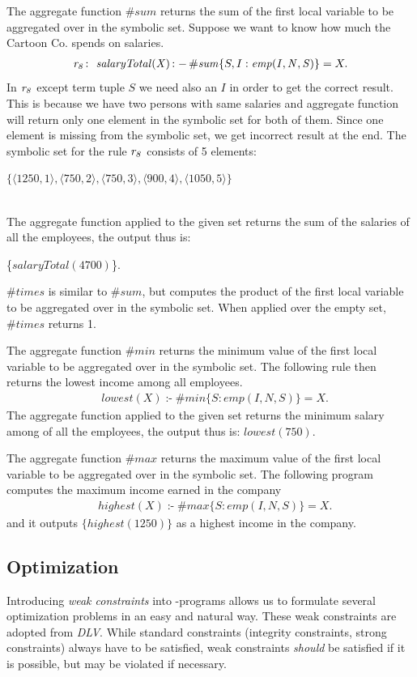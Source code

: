 \documentclass[a4paper, titlepage]{article}
\DeclareMathOperator{\leftimpl}{:-}
\newcommand{\row}[1]{%
  \ensuremath{\it \color{black} #1 \color{black}}%
}
\begin{document}
The aggregate function $\mathit{\#sum}$ returns the 
sum of the first local variable to be aggregated over in 
the symbolic set. Suppose we want to know how much the 
Cartoon Co. spends on salaries.
\begin{align*}
\mathit{\row{r_8} \colon \ salaryTotal(X)} \leftimpl \mathit{\#sum}\{S,I : 
\mathit{emp(I,N,S)}\} = X.
\end{align*}
In $\row{r_8}$ except term tuple $S$ we need also an $I$ in order to get the correct result. This is because we have two persons with same salaries and aggregate function will return only one element in the symbolic set for both of them. Since one element is missing from the symbolic set, we get incorrect result at the end.  
The symbolic set for the rule $\row{r_8}$ consists of 5 elements:\\ 
\centerline{$\{ \langle 1250,1 \rangle, \langle 750,2 \rangle, \langle 750,3 \rangle, \langle 900,4 \rangle, \langle 1050,5 \rangle\}$} 
\\The 
aggregate function applied to the given set returns the sum 
of the salaries of all the employees, the output thus is: 
\\ \centerline{
\{$\mathit{salaryTotal(4700)}$\}.} $\mathit{\#times}$ is 
similar to $\mathit{\#sum}$, but computes the product of 
the first local variable to be aggregated over in the 
symbolic set. When applied over the empty set, 
$\mathit{\#times}$ returns 1.

The aggregate function $\mathit{\#min}$ returns 
the minimum value of the first local variable to be 
aggregated over in the symbolic set. The following rule then returns the lowest income among all employees.
\begin{align*}
& lowest(X) \leftimpl \#min\{S : emp(I,N,S)\} = X.
\end{align*}
The aggregate function applied to the given set returns the 
minimum salary among of all the employees, the output thus 
is:
{$\mathit{lowest(750)}$}.

The aggregate function $\mathit{\#max}$ returns 
the maximum value of the first local variable to be 
aggregated over in the symbolic set. The following program 
computes the maximum income earned in the company
\begin{align*}
& \mathit{highest}(X) \leftimpl \mathit{\#max}\{S : 
\mathit{emp}(I,N,S)\} = X.
\end{align*}
and it outputs $\{highest(1250)\}$ as a highest income in 
the company.

\subsection{Optimization}
\label{optimize}
Introducing \emph{weak constraints} into \hex-programs 
allows us to formulate several optimization problems in an 
easy and natural way. These weak constraints are adopted 
from \emph{DLV}. While standard constraints (integrity 
constraints, strong constraints) always have to be 
satisfied, weak constraints \emph{should} be satisfied if it is 
possible, but may be violated if necessary.
\end{document}
